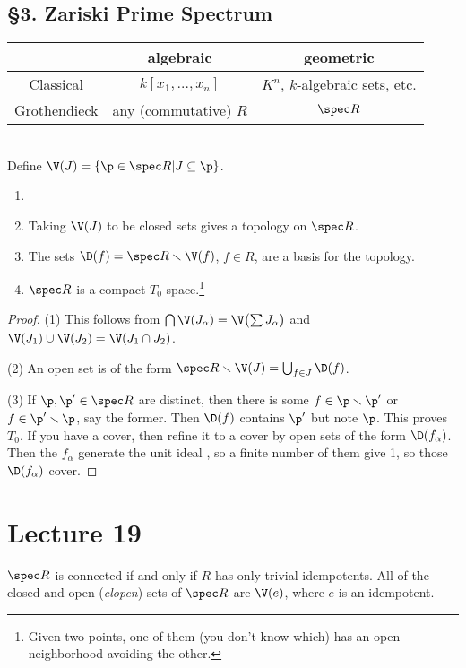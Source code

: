  \subsection{\S 3. Zariski Prime Spectrum}
 \begin{tabular}{c|c|c|}
    & algebraic & geometric\\ \hline
   Classical & $k[x_1,\dots, x_n]$ & $K^n$, $k$-algebraic sets, etc. \\ \hline
   Grothendieck & any (commutative) $R$ & $\spec R$
 \end{tabular}\\
 Define $\V(J)=\{\p\in \spec R| J\subseteq \p\}$.
 \begin{theorem}
  \begin{enumerate}\item[]
   \item Taking $\V(J)$ to be closed sets gives a topology on $\spec R$.
   \item The sets $\D(f) = \spec R\smallsetminus \V(f)$, $f\in R$, are a basis for
         the topology.
   \item $\spec R$ is a compact $T_0$ space.\footnote{Given two points, one of them
         (you don't know which) has an open neighborhood avoiding the other.}
  \end{enumerate}
 \end{theorem}
 \begin{proof}
  (1) This follows from $\bigcap \V(J_\alpha)=\V\bigl( \sum J_\alpha \bigr)$ and
  $\V(J_1)\cup \V(J_2)=\V(J_1\cap J_2)$.

  (2) An open set is of the form $\spec R\smallsetminus \V(J) = \bigcup_{f\in J}\D(f)$.

  (3) If $\p,\p'\in \spec R$ are distinct, then there is some $f\in \p\smallsetminus \p'$
  or $f\in \p'\smallsetminus \p$, say the former. Then $\D(f)$ contains $\p'$ but note
  $\p$. This proves $T_0$. If you have a cover, then refine it to a cover by open sets of
  the form $\D(f_\alpha)$. Then the $f_\alpha$ generate the unit ideal \anton{}, so a
  finite number of them give 1, so those $\D(f_\alpha)$ cover.
 \end{proof}
 \setcounter{lecture}{19}
 \section{Lecture 19}

 $\spec R$ is connected if and only if $R$ has only trivial idempotents. All of the
 closed and open (\emph{clopen}) sets of $\spec R$ are $\V(e)$, where $e$ is an
 idempotent.

